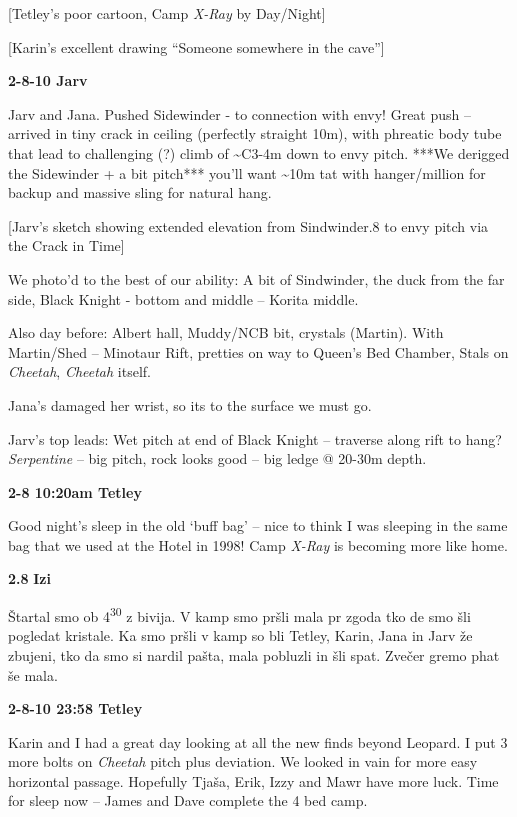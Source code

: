 {[}Tetley's poor cartoon, Camp \emph{X-Ray} by Day/Night{]}

{[}Karin's excellent drawing ``Someone somewhere in the cave''{]}

\textbf{2-8-10 Jarv}

Jarv and Jana. Pushed Sidewinder - to connection with envy! Great push
-- arrived in tiny crack in ceiling (perfectly straight 10m), with
phreatic body tube that lead to challenging (?) climb of
\textasciitilde{}C3-4m down to envy pitch. ***We derigged the Sidewinder
+ a bit pitch*** you'll want \textasciitilde{}10m tat with
hanger/million for backup and massive sling for natural hang.

{[}Jarv's sketch showing extended elevation from Sindwinder.8 to envy
pitch via the Crack in Time{]}

We photo'd to the best of our ability: A bit of Sindwinder, the duck
from the far side, Black Knight - bottom and middle -- Korita middle.

Also day before: Albert hall, Muddy/NCB bit, crystals (Martin). With
Martin/Shed -- Minotaur Rift, pretties on way to Queen's Bed Chamber,
Stals on \emph{Cheetah}, \emph{Cheetah} itself.

Jana's damaged her wrist, so its to the surface we must go.

Jarv's top leads: Wet pitch at end of Black Knight -- traverse along
rift to hang? \emph{Serpentine} -- big pitch, rock looks good -- big
ledge @ 20-30m depth.

\textbf{2-8 10:20am Tetley}

Good night's sleep in the old `buff bag' -- nice to think I was sleeping
in the same bag that we used at the Hotel in 1998! Camp \emph{X-Ray} is
becoming more like home.

\textbf{2.8} \textbf{Izi}

Štartal smo ob 4\textsuperscript{30} z bivija. V kamp smo pršli mala pr
zgoda tko de smo šli pogledat kristale. Ka smo pršli v kamp so bli
Tetley, Karin, Jana in Jarv že zbujeni, tko da smo si nardil pašta, mala
pobluzli in šli spat. Zvečer gremo phat še mala.

\textbf{2-8-10 23:58 Tetley}

Karin and I had a great day looking at all the new finds beyond Leopard.
I put 3 more bolts on \emph{Cheetah} pitch plus deviation. We looked in
vain for more easy horizontal passage. Hopefully Tjaša, Erik, Izzy and
Mawr have more luck. Time for sleep now -- James and Dave complete the 4
bed camp.

